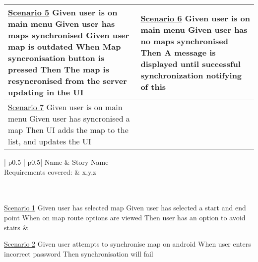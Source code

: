 \begin{longtable}{| p{} | p{}|}
	\underline{Scenario 5}\newline
	Given user is on main menu \newline
	Given user has maps synchronised \newline
	Given user map is outdated \newline
	When Map syncronisation button is pressed \newline 
	Then The map is resyncronised from the server updating in the UI\newline
	
	&
	
	\underline{Scenario 6}\newline
	Given user is on main menu \newline
	Given user has no maps synchronised \newline
	Then A message is displayed until successful synchronization notifying of this\newline\\\hline
	
	\underline{Scenario 7}\newline
	Given user is on main menu \newline
	Given user has syncronised a map\newline
	Then UI adds the map to the list, and updates the UI\newline
	&
	\\\hline
\end{longtable}

\begin{longtable}{| p{} | p{}|}
	\hline
	Name & Story Name\\\hline
	Requirements covered: & x,y,z\\\hline
	\\\hline
	\\\hline

	\underline{Scenario 1}\newline
	Given user has selected map \newline
	Given user has selected a start and end point \newline
	When on map route options are viewed \newline 
	Then user has an option to avoid stairs\newline
	&
	
	\underline{Scenario 2}\newline
	Given user attempts to synchronise map on android\newline
	When user enters incorrect password \newline 
	Then synchronisation will fail\newline
	\\\hline
\end{longtable}

